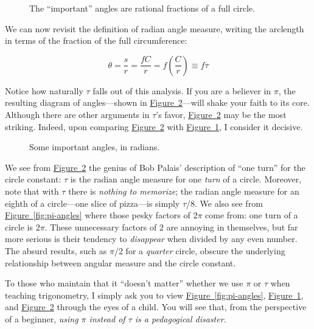 \documentclass{article}
\begin{document}
\begin{figure}
\begin{center}
\end{center}
\caption{The ``important'' angles are rational fractions of a full circle.\label{fig:angle-fractions}}
\end{figure}

\noindent We can now revisit the definition of radian angle measure, writing the arclength in terms of the fraction of the full circumference:

\[ \theta = \frac{s}{r} = \frac{fC}{r} =  f\left(\frac{C}{r}\right) \equiv f\tau \]

\noindent Notice how naturally $\tau$ falls out of this analysis. If you are a believer in $\pi$, the resulting diagram of angles---shown in \hyperref[fig:tau-angles]{Figure~}\ref{fig:tau-angles}---will shake your faith to its core. Although there are other arguments in $\tau$'s favor, \hyperref[fig:tau-angles]{Figure~}\ref{fig:tau-angles} may be the most striking. Indeed, upon comparing \hyperref[fig:tau-angles]{Figure~}\ref{fig:tau-angles} with \hyperref[fig:angle-fractions]{Figure~}\ref{fig:angle-fractions}, I consider it decisive.

\begin{figure}
\begin{center}
\end{center}
\caption{Some important angles, in radians.\label{fig:tau-angles}}
\end{figure}

We see from \hyperref[fig:tau-angles]{Figure~}\ref{fig:tau-angles} the genius of Bob Palais' description of ``one turn'' for the circle constant: $\tau$ is the radian angle measure for one \emph{turn} of a circle. Moreover, note that with $\tau$ there is \emph{nothing to memorize}; the radian angle measure for an eighth of a circle---one slice of pizza---is simply $\tau$/8. We also see from \hyperref[fig:pi-angles]{Figure~}\ref{fig:pi-angles} where those pesky factors of $2\pi$ come from: one turn of a circle is $2\pi$. These unnecessary factors of $2$ are annoying in themselves, but far more serious is their tendency to \emph{disappear} when divided by any even number. The absurd results, such as $\pi$/2 for a \emph{quarter} circle, obscure the underlying relationship between angular measure and the circle constant.

To those who maintain that it ``doesn't matter'' whether we use $\pi$ or $\tau$ when teaching trigonometry, I simply ask you to view \hyperref[fig:pi-angles]{Figure~}\ref{fig:pi-angles}, \hyperref[fig:angle-fractions]{Figure~}\ref{fig:angle-fractions}, and \hyperref[fig:tau-angles]{Figure~}\ref{fig:tau-angles} through the eyes of a child. You will see that, from the perspective of a beginner, \emph{using $\pi$ instead of $\tau$ is a pedagogical disaster.}
\end{document}
